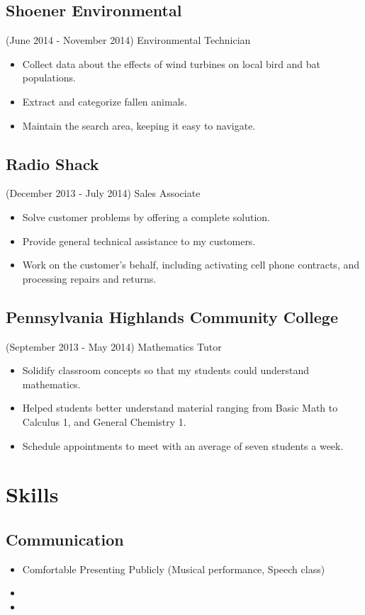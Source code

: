 \documentclass{article}
\begin{document}
    \subsection{Shoener Environmental}
      (June 2014 - November 2014)
      Environmental Technician
      \begin{itemize}
        \item Collect data about the effects of wind turbines on local bird and bat populations.
        \item Extract and categorize fallen animals.
        \item Maintain the search area, keeping it easy to navigate.
      \end{itemize}
    \subsection{Radio Shack}
      (December 2013 - July 2014)
      Sales Associate
      \begin{itemize}
        \item Solve customer problems by offering a complete solution.
        \item Provide general technical assistance to my customers.
        \item Work on the customer's behalf, including activating cell phone contracts, and processing repairs and returns.
      \end{itemize}
    \subsection{Pennsylvania Highlands Community College}
      (September 2013 - May 2014)
      Mathematics Tutor
      \begin{itemize}
        \item Solidify classroom concepts so that my students could understand mathematics. 
        \item Helped students better understand material ranging from Basic Math to Calculus 1, and General Chemistry 1.
        \item Schedule appointments to meet with an average of seven students a week.
      \end{itemize}
    
  \section{Skills}
    \subsection{Communication}
      \begin{itemize}
        \item Comfortable Presenting Publicly (Musical performance, Speech class)
        \item 
        \item 
      \end{itemize}
\end{document}
